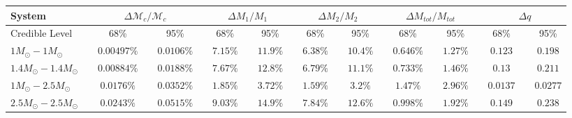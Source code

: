 \documentclass[11pt,a4paper]{emulateapj} 
\newcommand{\chmass}{\mathcal{M}_c}
\begin{document}
\begin{table}[h!]
{\begin{tabular}{lcccccccccccccccccccc}
 \hline\hline System & \vline & \multicolumn{3}{c}{$\Delta \chmass / \chmass$} &
\vline & \multicolumn{3}{c}{$\Delta M_1 / M_1$} & \vline & \multicolumn{3}{c}{$\Delta M_2 / M_2$} & \vline &
\multicolumn{3}{c}{$\Delta M_{tot}/M_{tot}$} & \vline & \multicolumn{3}{c}{$\Delta q$}\\ \hline
Credible Level & \vline & 68\% & \vline & 95\% & \vline & 68\% & \vline & 95\% & \vline & 68\% & \vline & 95\% & \vline & 68\% & \vline & 95\% & \vline & 68\% & \vline & 95\% \\
\hline\hline

$1M_{\odot}-1M_{\odot}$ & \vline &$0.00497\%$ & \vline &$0.0106\%$ & \vline & $7.15\%$ & \vline &$11.9\%$ & \vline & $6.38\%$ & \vline &$10.4\%$ & \vline & $0.646\%$ & \vline &$1.27\%$ & \vline & $0.123$ & \vline &$0.198$\\\hline$1.4M_{\odot}-1.4M_{\odot}$ & \vline &$0.00884\%$ & \vline &$0.0188\%$ & \vline & $7.67\%$ & \vline &$12.8\%$ & \vline & $6.79\%$ & \vline &$11.1\%$ & \vline & $0.733\%$ & \vline &$1.46\%$ & \vline & $0.13$ & \vline &$0.211$\\\hline$1M_{\odot}-2.5M_{\odot}$ & \vline &$0.0176\%$ & \vline &$0.0352\%$ & \vline & $1.85\%$ & \vline &$3.72\%$ & \vline & $1.59\%$ & \vline &$3.2\%$ & \vline & $1.47\%$ & \vline &$2.96\%$ & \vline & $0.0137$ & \vline &$0.0277$\\\hline$2.5M_{\odot}-2.5M_{\odot}$ & \vline &$0.0243\%$ & \vline &$0.0515\%$ & \vline & $9.03\%$ & \vline &$14.9\%$ & \vline & $7.84\%$ & \vline &$12.6\%$ & \vline & $0.998\%$ & \vline &$1.92\%$ & \vline & $0.149$ & \vline &$0.238$\\

\hline
\hline


\end{tabular}}
\label{ciTableIntrinsic}
\end{table}
\end{document}
